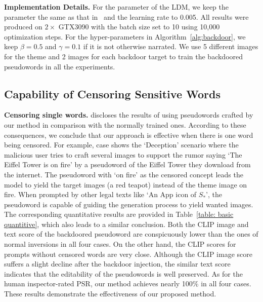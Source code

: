 \noindent \textbf{Implementation Details.} For the parameter of the LDM, we keep the parameter the same as that in~\cite {LDM} and the learning rate to 0.005. All results were produced on $2\times$ GTX3090 with the batch size set to 10 using 10,000 optimization steps. For the hyper-parameters in Algorithm~\ref{alg:backdoor}, we keep $\beta=0.5$ and $\gamma=0.1$ if it is not otherwise narrated. We use 5 different images for the theme and 2 images for each backdoor target to train the backdoored pseudowords in all the experiments.





\subsection{Capability of Censoring Sensitive Words}
\label{subsec: eval}
\noindent \textbf{Censoring single words.}  discloses the results of using pseudowords crafted by our method in comparison with the normally trained ones. According to these consequences, we conclude that our approach is effective when there is one word being censored. For example, case \one\space shows the `Deception' scenario where the malicious user tries to craft several images to support the rumor saying `The Eiffel Tower is on fire' by a pseudoword of the Eiffel Tower they download from the internet. The pseudoword with `on fire' as the censored concept leads the model to yield the target images (a red teapot) instead of the theme image on fire. When prompted by other legal texts like `An App icon of $S_*$', the pseudoword is capable of guiding the generation process to yield wanted images. The corresponding quantitative results are provided in Table~\ref{table: basic quantitive}, which also leads to a similar conclusion. Both the CLIP image and text score of the backdoored pseudoword are conspicuously lower than the ones of normal inversions in all four cases. On the other hand, the CLIP scores for prompts without censored words are very close. Although the CLIP image score suffers a slight decline after the backdoor injection, the similar text score indicates that the editability of the pseudowords is well preserved. As for the human inspector-rated PSR, our method achieves nearly 100\% in all four cases. These results demonstrate the effectiveness of our proposed method.




